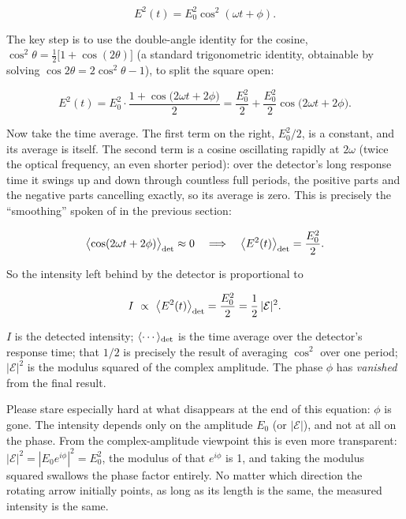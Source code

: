 \[
  E^2(t)=E_0^2\cos^2(\omega t+\phi).
\]

The key step is to use the double-angle identity for the cosine, \(\cos^2\theta=\tfrac12\bigl[1+\cos(2\theta)\bigr]\) (a standard trigonometric identity, obtainable by solving \(\cos 2\theta=2\cos^2\theta-1\)), to split the square open:

\[
  E^2(t)=E_0^2\cdot\frac{1+\cos\!\bigl(2\omega t+2\phi\bigr)}{2}
  =\frac{E_0^2}{2}+\frac{E_0^2}{2}\cos\!\bigl(2\omega t+2\phi\bigr).
\]

Now take the time average. The first term on the right, \(E_0^2/2\), is a constant, and its average is itself. The second term is a cosine oscillating rapidly at \(2\omega\) (twice the optical frequency, an even shorter period): over the detector's long response time it swings up and down through countless full periods, the positive parts and the negative parts cancelling exactly, so its average is zero. This is precisely the ``smoothing'' spoken of in the previous section:

\[
  \bigl\langle\cos(2\omega t+2\phi)\bigr\rangle_{\rm det}\approx 0
  \quad\Longrightarrow\quad
  \bigl\langle E^2(t)\bigr\rangle_{\rm det}=\frac{E_0^2}{2}.
\]

So the intensity left behind by the detector is proportional to

\begin{equation}
  I\ \propto\ \bigl\langle E^2(t)\bigr\rangle_{\rm det}=\frac{E_0^2}{2}=\frac{1}{2}\,|\mathcal E|^2 .
  \label{eq:e01-intensity}
\end{equation}
\begin{formulaexplain}
\(I\) is the detected intensity; \(\langle\cdots\rangle_{\rm det}\) is the time average over the detector's response time; that \(1/2\) is precisely the result of averaging \(\cos^2\) over one period; \(|\mathcal E|^2\) is the modulus squared of the complex amplitude. The phase \(\phi\) has \emph{vanished} from the final result.
\end{formulaexplain}

Please stare especially hard at what disappears at the end of this equation: \(\phi\) is gone. The intensity depends only on the amplitude \(E_0\) (or \(|\mathcal E|\)), and not at all on the phase. From the complex-amplitude viewpoint this is even more transparent: \(|\mathcal E|^2=|E_0e^{i\phi}|^2=E_0^2\), the modulus of that \(e^{i\phi}\) is 1, and taking the modulus squared swallows the phase factor entirely. No matter which direction the rotating arrow initially points, as long as its length is the same, the measured intensity is the same.

